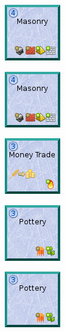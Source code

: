 \documentclass{article}
\begin{document}
\begin{figure}
  \begin{subfigure}{}
    \includegraphics[scale=1]{../rules/png/doe_tech_masonry.png}
  \end{subfigure}
  \begin{subfigure}{}
    \includegraphics[scale=1]{../rules/png/doe_tech_masonry.png}
  \end{subfigure}
  \begin{subfigure}{}
    \includegraphics[scale=1]{../rules/png/doe_tech_money_trade.png}
  \end{subfigure}
  \begin{subfigure}{}
    \includegraphics[scale=1]{../rules/png/doe_tech_pottery.png}
  \end{subfigure}
  \begin{subfigure}{}
    \includegraphics[scale=1]{../rules/png/doe_tech_pottery.png}
  \end{subfigure}
\end{figure}
\end{document}
